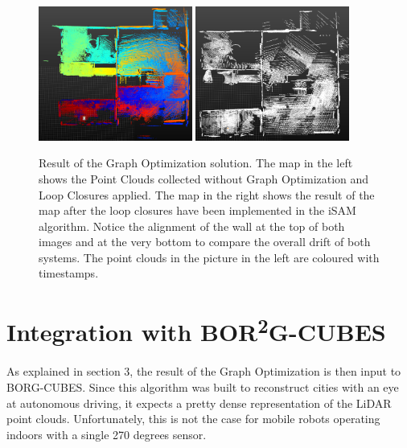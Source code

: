 \documentclass[11pt]{article}
\begin{document}
	\begin{figure}[ht]
		\includegraphics[width=0.45\textwidth]{ResultNoLoopClosure}
		\includegraphics[width=0.45\textwidth]{ResultLoopClosure}
		\caption{Result of the Graph Optimization solution. The map in the left shows the Point Clouds collected without Graph Optimization and Loop Closures applied. The map in the right shows the result of the map after the loop closures have been implemented in the iSAM algorithm. Notice the alignment of the wall at the top of both images and at the very bottom to compare the overall drift of both systems. The point clouds in the picture in the left are coloured with timestamps.}
		\label{fig:GraphOptimization1}	
	\end{figure}
	\newpage
	\section{Integration with BOR\textsuperscript{2}G-CUBES}
	\paragraph{}
	As explained in section 3, the result of the Graph Optimization is then input to BORG-CUBES. Since this algorithm was built to reconstruct cities with an eye at autonomous driving, it expects a pretty dense representation of the LiDAR point clouds. Unfortunately, this is not the case for mobile robots operating indoors with a single 270 degrees sensor.
	
\end{document}
